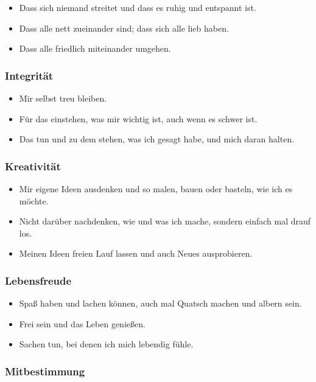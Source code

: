 \begin{itemize}
  \item Dass sich niemand streitet und dass es ruhig und entspannt ist.
  \item Dass alle nett zueinander sind; dass sich alle lieb haben.
  \item Dass alle friedlich miteinander umgehen.
\end{itemize}


\subsubsection{Integrität}

\begin{itemize}
  \item Mir selbst treu bleiben.
  \item Für das einstehen, was mir wichtig ist, auch wenn es schwer ist.
  \item Das tun und zu dem stehen, was ich gesagt habe, und mich daran halten.
\end{itemize}


\subsubsection{Kreativität}

\begin{itemize}
  \item Mir eigene Ideen ausdenken und so malen, bauen oder basteln, wie ich es möchte.
  \item Nicht darüber nachdenken, wie und was ich mache, sondern einfach mal drauf los.
  \item Meinen Ideen freien Lauf lassen und auch Neues ausprobieren.
\end{itemize}


\subsubsection{Lebensfreude}

\begin{itemize}
  \item Spaß haben und lachen können, auch mal Quatsch machen und albern sein.
  \item Frei sein und das Leben genießen.
  \item Sachen tun, bei denen ich mich lebendig fühle.
\end{itemize}


\subsubsection{Mitbestimmung}


